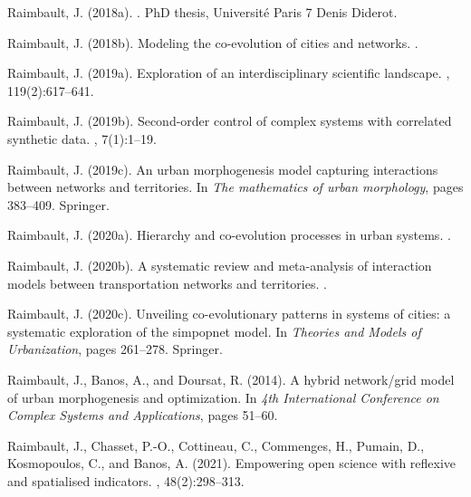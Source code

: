\documentclass[10pt]{article}
\begin{document}
\begin{thebibliography}{}
Raimbault, J. (2018a).
.
\newblock PhD thesis, Universit{\'e} Paris 7 Denis Diderot.

Raimbault, J. (2018b).
\newblock Modeling the co-evolution of cities and networks.
.

Raimbault, J. (2019a).
\newblock Exploration of an interdisciplinary scientific landscape.
, 119(2):617--641.

Raimbault, J. (2019b).
\newblock Second-order control of complex systems with correlated synthetic
  data.
, 7(1):1--19.

Raimbault, J. (2019c).
\newblock An urban morphogenesis model capturing interactions between networks
  and territories.
\newblock In {\em The mathematics of urban morphology}, pages 383--409.
  Springer.

Raimbault, J. (2020a).
\newblock Hierarchy and co-evolution processes in urban systems.
.

Raimbault, J. (2020b).
\newblock A systematic review and meta-analysis of interaction models between
  transportation networks and territories.
.

Raimbault, J. (2020c).
\newblock Unveiling co-evolutionary patterns in systems of cities: a systematic
  exploration of the simpopnet model.
\newblock In {\em Theories and Models of Urbanization}, pages 261--278.
  Springer.

Raimbault, J., Banos, A., and Doursat, R. (2014).
\newblock A hybrid network/grid model of urban morphogenesis and optimization.
\newblock In {\em 4th International Conference on Complex Systems and
  Applications}, pages 51--60.

Raimbault, J., Chasset, P.-O., Cottineau, C., Commenges, H., Pumain, D.,
  Kosmopoulos, C., and Banos, A. (2021).
\newblock Empowering open science with reflexive and spatialised indicators.
,
  48(2):298--313.


\end{thebibliography}
\end{document}
